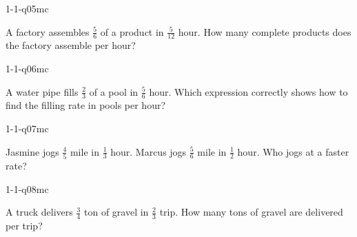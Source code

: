 \begin{practiceQuestion}{1-1-q05}{mc}
\begin{questionText}
A factory assembles $\frac{5}{6}$ of a product in $\frac{5}{12}$ hour. How many complete products does the factory assemble per hour?
\end{questionText}
\end{practiceQuestion}

\begin{practiceQuestion}{1-1-q06}{mc}
\begin{questionText}
A water pipe fills $\frac{2}{3}$ of a pool in $\frac{5}{6}$ hour. Which expression correctly shows how to find the filling rate in pools per hour?
\end{questionText}
\end{practiceQuestion}

\begin{practiceQuestion}{1-1-q07}{mc}
\begin{questionText}
Jasmine jogs $\frac{4}{5}$ mile in $\frac{1}{3}$ hour. Marcus jogs $\frac{5}{6}$ mile in $\frac{1}{2}$ hour. Who jogs at a faster rate?
\end{questionText}
\end{practiceQuestion}

\begin{practiceQuestion}{1-1-q08}{mc}
\begin{questionText}
A truck delivers $\frac{3}{4}$ ton of gravel in $\frac{2}{3}$ trip. How many tons of gravel are delivered per trip?
\end{questionText}
\end{practiceQuestion}

